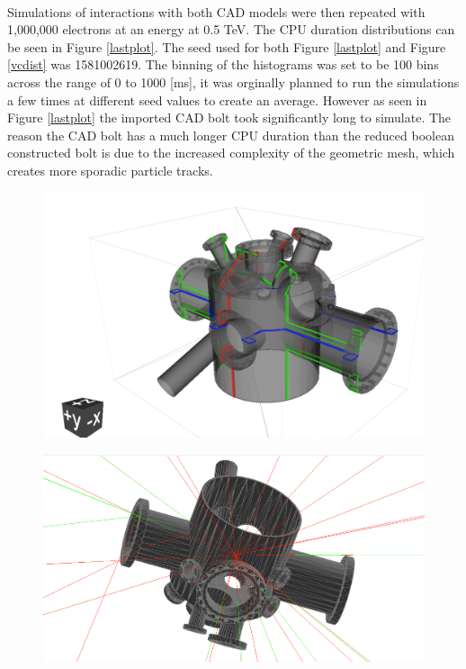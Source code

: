 \documentclass[12pt,a4paper]{article}
\begin{document}
\\
\noindent Simulations of interactions with both CAD models were then repeated with 1,000,000 electrons at an energy at 0.5 TeV. The CPU duration distributions can be seen in Figure \ref{lastplot}. The seed used for both Figure \ref{lastplot} and Figure \ref{vcdist} was 1581002619. The binning of the histograms was set to be 100 bins across the range of 0 to 1000 [ms], it was orginally planned to run the simulations a few times at different seed values to create an average. However as seen in Figure \ref{lastplot} the imported CAD bolt took significantly long to simulate. The reason the CAD bolt has a much longer CPU duration than the reduced boolean constructed bolt is due to the increased complexity of the geometric mesh, which creates more sporadic particle tracks.
\\
\begin{figure}[h!]
\centering
\begin{minipage}{.5\textwidth}
  \centering
  \includegraphics[height=0.5\linewidth]{Images//VC//VC1.png}
  \label{vcvtk}
\end{minipage}%
\begin{minipage}{.5\textwidth}
  \centering
  \includegraphics[height=0.5\linewidth]{Images//VC//VC4.png}
  \label{vcbdsim}
\end{minipage}%
\end{figure}
\end{document}
